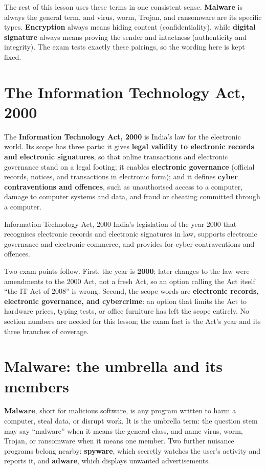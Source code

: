 The rest of this lesson uses these terms in one consistent sense.
\textbf{Malware} is always the general term, and virus, worm, Trojan, and
ransomware are its specific types. \textbf{Encryption} always means hiding
content (confidentiality), while \textbf{digital signature} always means
proving the sender and intactness (authenticity and integrity). The exam
tests exactly these pairings, so the wording here is kept fixed.

\section{The Information Technology Act, 2000}
The \textbf{Information Technology Act, 2000} is India's law for the
electronic world. Its scope has three parts: it gives \textbf{legal
validity to electronic records and electronic signatures}, so that online
transactions and electronic governance stand on a legal footing; it enables
\textbf{electronic governance} (official records, notices, and transactions
in electronic form); and it defines \textbf{cyber contraventions and
offences}, such as unauthorised access to a computer, damage to computer
systems and data, and fraud or cheating committed through a computer.

\begin{definitionbox}{Information Technology Act, 2000}
India's legislation of the year 2000 that recognises electronic records
and electronic signatures in law, supports electronic governance and
electronic commerce, and provides for cyber contraventions and offences.
\end{definitionbox}

Two exam points follow. First, the year is \textbf{2000}; later changes to
the law were amendments to the 2000 Act, not a fresh Act, so an option
calling the Act itself ``the IT Act of 2008'' is wrong. Second, the scope
words are \textbf{electronic records, electronic governance, and
cybercrime}: an option that limits the Act to hardware prices, typing
tests, or office furniture has left the scope entirely. No section numbers
are needed for this lesson; the exam fact is the Act's year and its three
branches of coverage.

\section{Malware: the umbrella and its members}
\textbf{Malware}, short for malicious software, is any program written to
harm a computer, steal data, or disrupt work. It is the umbrella term: the
question stem may say ``malware'' when it means the general class, and name
virus, worm, Trojan, or ransomware when it means one member. Two further
nuisance programs belong nearby: \textbf{spyware}, which secretly watches
the user's activity and reports it, and \textbf{adware}, which displays
unwanted advertisements.

